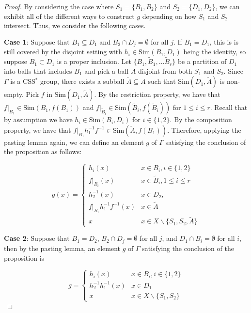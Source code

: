\documentclass[12pt]{amsart}
\numberwithin{equation}{subsection}
\theoremstyle{definition}
\theoremstyle{definition}
\theoremstyle{remark}
\begin{document}
\begin{proof}
    
   
    
    By considering the case where $S_1 = \{B_1, B_2\}$ and $S_2 = \{D_1, D_2\}$, we can exhibit all of the different ways to construct $g$ depending on how $S_1$ and $S_2$ intersect. Thus, we consider the following cases. 
    
    
   


    \noindent\textbf{Case 1}: Suppose that $B_1 \subseteq D_1$ and $B_2 \cap D_j = \emptyset$ for all $j$.  If $B_1 = D_1$, this is is still covered by the disjoint setting with $h_i \in \text{Sim}(B_1,D_1)$ being the identity, so suppose $B_1 \subset D_1$ is a proper inclusion. Let $\{B_1, \tilde B_1, \dots \tilde B_r \}$ be a partition of $D_1$ into balls that includes $B_1$ and pick a ball $A$ disjoint from both $S_1$ and $S_2$. Since $\Gamma$ is a CSS$^*$ group, there exists a subball $\tilde A \subseteq A$ such that $\text{Sim}(D_1,\tilde A)$ is non-empty. Pick $f$ in $\text{Sim}(D_1,\tilde A)$. By the restriction property, we have that $f\vert_{B_1} \in \text{Sim}(B_1, f(B_1))$ and $f\vert_{\tilde B_i} \in \text{Sim}(\tilde B_i, f(\tilde B_i))$ for $1 \leq i \leq r$. Recall that by assumption we have $h_i \in \text{Sim}(B_i,D_i)$ for $i \in \{1,2\}$. By the composition property, we have that $f\vert_{B_1}h_1^{-1}f^{-1} \in \text{Sim}(\tilde A, f(B_1))$. Therefore, applying the pasting lemma again, we can define an element $g$ of $\Gamma$ satisfying the conclusion of the proposition as follows:


     \[ g(x) = \begin{cases} h_i(x) & x \in B_i, i\in\{1,2\} \\
     f\vert_{\tilde B_i}(x) & x \in \tilde B_i, 1 \leq i \leq r\\
    h_2^{-1}(x) & x \in D_2, \\
    f\vert_{B_1}h_1^{-1}f^{-1} (x) & x\in \tilde A\\
    x & x \in X \backslash \{S_1, S_2, \tilde A\}
    \end{cases}
    \]

     \noindent\textbf{Case 2}: Suppose that $B_1=D_2$, $B_2 \cap D_j = \emptyset$ for all $j$, and $D_1 \cap B_i = \emptyset$ for all $i$, then by the pasting lemma, an element $g$ of $\Gamma$ satisfying the conclusion of the proposition is

    \[ g = \begin{cases} h_i(x) & x \in B_i, i\in\{1,2\}  \\
    h_2^{-1}h_1^{-1}(x) & x \in D_1 \\
    x & x \in X \backslash \{S_1, S_2\}
    \end{cases}
    \]


\end{proof}
\end{document}
